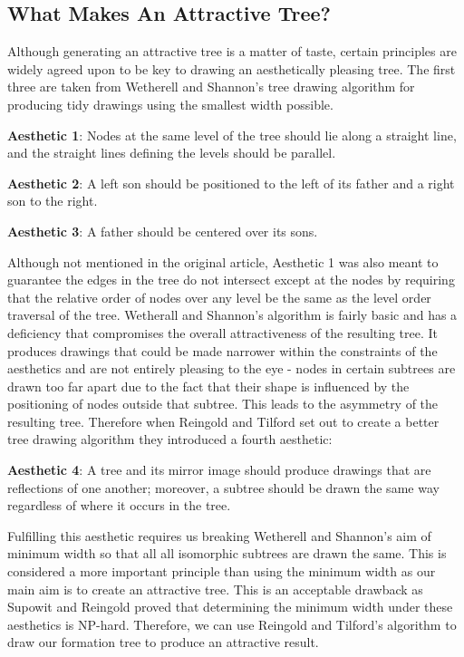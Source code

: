 \documentclass{report}
\begin{document}
\subsection{What Makes An Attractive Tree?}

Although generating an attractive tree is a matter of taste, certain principles are widely agreed upon to be key to drawing an aesthetically pleasing tree. The first three are taken from Wetherell and Shannon's tree drawing algorithm for producing tidy drawings using the smallest width possible\cite{tidierdrawingsws}.

\textbf{Aesthetic 1}: Nodes at the same level of the tree should lie along a straight line, and the straight lines defining the levels should be parallel. 

\textbf{Aesthetic 2}: A left son should be positioned to the left of its father and a right son to the right.

\textbf{Aesthetic 3}: A father should be centered over its sons.

Although not mentioned in the original article, Aesthetic 1 was also meant to guarantee the edges in the tree do not intersect except at the nodes by requiring that the relative order of nodes over any level be the same as the level order traversal of the tree. Wetherall and Shannon's algorithm is fairly basic and has a deficiency that compromises the overall attractiveness of the resulting tree. It produces drawings that could be made narrower within the constraints of the aesthetics and are not entirely pleasing to the eye - nodes in certain subtrees are drawn too far apart due to the fact that their shape is influenced by the positioning of nodes outside that subtree. This leads to the asymmetry of the resulting tree. Therefore when Reingold and Tilford\cite{tidierdrawingsrt} set out to create a better tree drawing algorithm they introduced a fourth aesthetic:

\textbf{Aesthetic 4}: A tree and its mirror image should produce drawings that are reflections of one another; moreover, a subtree should be drawn the same way regardless of where it occurs in the tree.

Fulfilling this aesthetic requires us breaking Wetherell and Shannon's aim of minimum width so that all all isomorphic subtrees are drawn the same. This is considered a more important principle than using the minimum width as our main aim is to create an attractive tree. This is an acceptable drawback as Supowit and Reingold proved that determining the minimum width under these aesthetics is NP-hard\cite{complexityofdrawingtreesnicely}. Therefore, we can use Reingold and Tilford's algorithm to draw our formation tree to produce an attractive result. 
\end{document}
